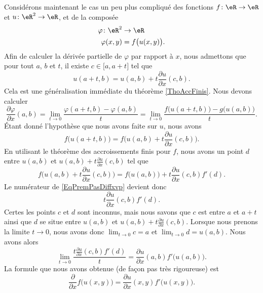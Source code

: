 Considérons maintenant le cas un peu plus compliqué des fonctions $f\colon \eR\to \eR$ et $u\colon \eR^2\to \eR$, et de la composée
\begin{equation}
	\begin{aligned}
		\varphi\colon \eR^2&\to \eR \\
		\varphi(x,y)&= f\big( u(x,y) \big). 
	\end{aligned}
\end{equation}
Afin de calculer la dérivée partielle de $\varphi$ par rapport à $x$, nous admettons que pour tout $a$, $b$ et $t$, il existe $c\in\mathopen[ a , a+t \mathclose]$ tel que
\begin{equation}
	u(a+t,b)=u(a,b)+t\frac{ \partial u }{ \partial x }(c,b).
\end{equation}
Cela est une généralisation immédiate du théorème \ref{ThoAccFinis}. Nous devons calculer
\begin{equation}		\label{EqPremPasDiffxvp}
	\frac{ \partial \varphi }{ \partial x }(a,b)=\lim_{t\to 0} \frac{ \varphi(a+t,b)-\varphi(a,b) }{ t }=\lim_{t\to 0} \frac{ f\big( u(a+t,b) \big)-g\big( u(a,b) \big) }{ t }.
\end{equation}
Étant donné l'hypothèse que nous avons faite sur $u$, nous avons
\begin{equation}
	f\big( u(a+t,b) \big)=f\big( u(a,b)+t\frac{ \partial u }{ \partial x }(c,b) \big).
\end{equation}
En utilisant le théorème des accroissements finis pour $f$, nous avons un point $d$ entre $u(a,b)$ et $u(a,b)+t\frac{ \partial u }{ \partial x }(c,b)$ tel que
\begin{equation}
	f\big( u(a,b)+t\frac{ \partial u }{ \partial x }(c,b) \big)=f\big( u(a,b) \big)+t\frac{ \partial u }{ \partial x }(c,b)f'(d).
\end{equation}
Le numérateur de \eqref{EqPremPasDiffxvp} devient donc
\begin{equation}
	t\frac{ \partial u }{ \partial x }(c,b)f'(d).
\end{equation}
Certes les points $c$ et $d$ sont inconnus, mais nous savons que $c$ est entre $a$ et $a+t$ ainsi que $d$ se situe entre $u(a,b)$ et $u(a,b)+t\frac{ \partial u }{ \partial x }(c,b)$. Lorsque nous prenons la limite $t\to 0$, nous avons donc $\lim_{t\to 0} c=a$ et $\lim_{t\to 0} d=u(a,b)$. Nous avons alors
\begin{equation}
	\lim_{t\to 0} \frac{ t\frac{ \partial u }{ \partial x }(c,b)f'(d) }{ t }=\frac{ \partial u }{ \partial x }(a,b)f'\big( u(a,b) \big).
\end{equation}
La formule que nous avons obtenue (de façon pas très rigoureuse) est
\begin{equation}
	\frac{ \partial  }{ \partial x }f\big( u(x,y) \big)=\frac{ \partial u }{ \partial x }(x,y)f'\big( u(x,y) \big).
\end{equation}

